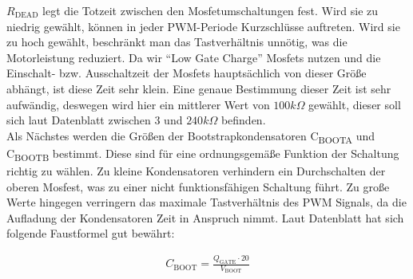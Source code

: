 $R_{\text{DEAD}}$ legt die Totzeit zwischen den Mosfetumschaltungen fest. Wird sie zu niedrig gewählt, können in jeder PWM-Periode Kurzschlüsse auftreten. Wird sie zu hoch
gewählt, beschränkt man das Tastverhältnis unnötig, was die Motorleistung reduziert. Da wir ``Low Gate Charge'' Mosfets nutzen und die Einschalt- bzw. Ausschaltzeit
der Mosfets hauptsächlich von dieser Größe abhängt, ist diese Zeit sehr klein. Eine genaue Bestimmung dieser Zeit ist sehr aufwändig, deswegen
wird hier ein mittlerer Wert von $100k\Omega$ gewählt, dieser soll sich laut Datenblatt zwischen 3 und $240k\Omega$ befinden.\\


%
% 
% 
% 



Als Nächstes werden die Größen der Bootstrapkondensatoren C\textsubscript{BOOTA} und C\textsubscript{BOOTB} bestimmt. Diese sind für eine ordnungsgemäße
Funktion der Schaltung richtig zu wählen. Zu kleine Kondensatoren verhindern ein Durchschalten der oberen Mosfest, was zu einer nicht funktionsfähigen Schaltung
führt. Zu große Werte hingegen verringern das maximale Tastverhältnis des PWM Signals, da die Aufladung der Kondensatoren Zeit in Anspruch nimmt.
Laut Datenblatt hat sich folgende Faustformel gut bewährt:

\begin{align*}
C_{\text{BOOT}}=\frac{Q_{\text{GATE}}\cdot20}{V_{\text{BOOT}}}
\end{align*}






